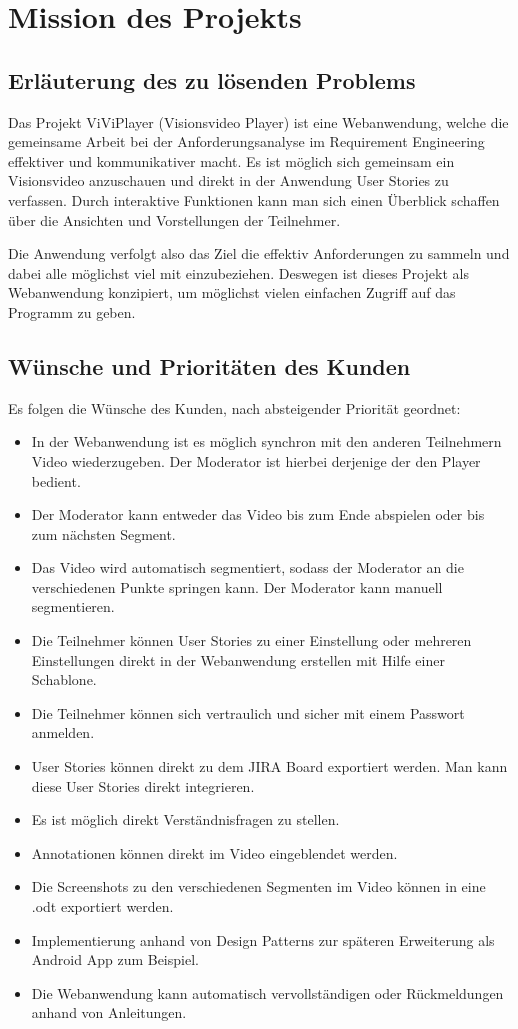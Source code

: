 \section{Mission des Projekts}

\subsection{Erläuterung des zu lösenden Problems}
Das Projekt ViViPlayer (Visionsvideo Player) ist eine Webanwendung, welche die gemeinsame Arbeit 
bei der Anforderungsanalyse im Requirement Engineering effektiver und kommunikativer macht.
Es ist möglich sich gemeinsam ein Visionsvideo anzuschauen und direkt in der Anwendung User Stories
zu verfassen. Durch interaktive Funktionen kann man sich einen Überblick schaffen über die Ansichten und Vorstellungen der Teilnehmer.

Die Anwendung verfolgt also das Ziel die effektiv Anforderungen zu sammeln und dabei alle möglichst viel mit einzubeziehen.
Deswegen ist dieses Projekt als Webanwendung konzipiert, um möglichst vielen einfachen Zugriff auf das Programm zu geben.

\subsection{Wünsche und Prioritäten des Kunden}
	Es folgen die Wünsche des Kunden, nach absteigender Priorität geordnet:
	\begin{itemize}
		\item In der Webanwendung ist es möglich synchron mit den anderen Teilnehmern Video wiederzugeben. Der Moderator ist hierbei derjenige der den Player bedient.
		\item Der Moderator kann entweder das Video bis zum Ende abspielen oder bis zum nächsten Segment.
		\item Das Video wird automatisch segmentiert, sodass der Moderator an die verschiedenen Punkte springen kann. Der Moderator kann manuell segmentieren.
		\item Die Teilnehmer können User Stories zu einer Einstellung oder mehreren Einstellungen direkt in der Webanwendung erstellen mit Hilfe einer Schablone.
		\item Die Teilnehmer können sich vertraulich und sicher mit einem Passwort anmelden.
		\item User Stories können direkt zu dem JIRA Board exportiert werden. Man kann diese User Stories direkt integrieren.
		\item Es ist möglich direkt Verständnisfragen zu stellen.
		\item Annotationen können direkt im Video eingeblendet werden.
		\item Die Screenshots zu den verschiedenen Segmenten im Video können in eine .odt exportiert werden.
		\item Implementierung anhand von Design Patterns zur späteren Erweiterung als Android App zum Beispiel.
		\item Die Webanwendung kann automatisch vervollständigen oder Rückmeldungen anhand von Anleitungen.
	\end{itemize}

